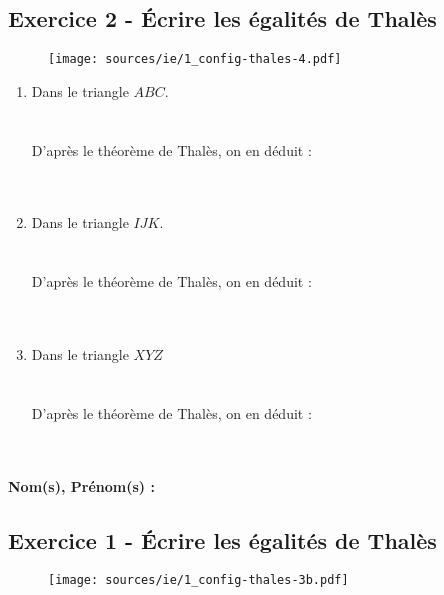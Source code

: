 \documentclass[12pt]{article}
\begin{document}
\subsection*{Exercice 2 - Écrire les égalités de Thalès}

\begin{figure}[H]
  \centering
  \texttt{[image: sources/ie/1\_config-thales-4.pdf]}
\end{figure}

\begin{multicols}{3}
  \begin{enumerate}
  \item Dans le triangle $ABC$.\\ 
  \phantom{abc}\\
  \phantom{abc}\\
  D'après le théorème de Thalès, on en déduit :\\
   \phantom{abc}\\
  \phantom{abc}\\
  \item Dans le triangle $IJK$.\\ 
  \phantom{abc}\\
  \phantom{abc}\\
  D'après le théorème de Thalès, on en déduit :\\
  \phantom{abc}\\
  \phantom{abc}\\
  \item Dans le triangle $XYZ$\\
  \phantom{abc}\\
  \phantom{abc}\\
  D'après le théorème de Thalès, on en déduit :\\
  \phantom{abc}\\
  \phantom{abc}\\
  \end{enumerate}
\end{multicols}

\newpage

\textbf{Nom(s), Prénom(s) :}

\subsection*{Exercice 1 - Écrire les égalités de Thalès}

\begin{figure}[H]
  \centering
  \texttt{[image: sources/ie/1\_config-thales-3b.pdf]}
\end{figure}
\end{document}
